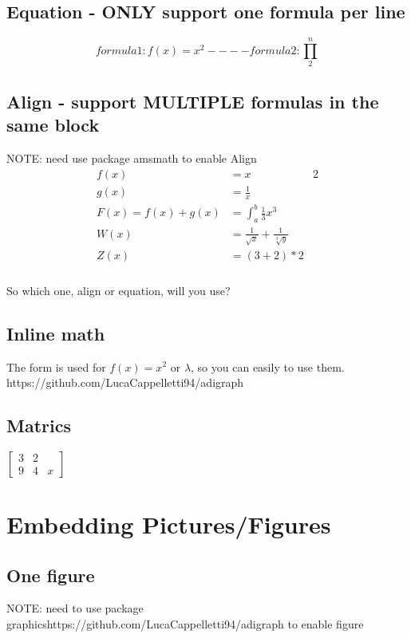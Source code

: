 \documentclass{article}   %
\begin{document}
  \subsection{Equation - ONLY support one formula per line}
  \begin{equation}
    formula 1: f(x) = x^2   ----
    formula 2: \prod_{2}^{n}
  \end{equation}

  \subsection{Align - support MULTIPLE formulas in the same block}
  NOTE: need use package amsmath to enable Align 
  \begin{align*}
    f(x) &= x & 2 \\
    g(x) &= \frac{1}{x} \\
    F(x) = f(x) + g(x) &= \int_{a}^{b} \frac{1}{3}x^3 \\
    W(x) &= \frac{1}{\sqrt{x}} + \frac{1}{\sqrt[3]{y}} \\
    Z(x) &= \left( 3 + 2 \right) * 2
  \end{align*}
  \subsubsection{}
  So which one, align or equation, will you use?


  \subsection{Inline math}
  The form is used for $ f(x) = x^ 2 $ or $\lambda$, so you can easily to use them. 
  https://github.com/LucaCappelletti94/adigraph
  \subsection{Matrics}
  $
  \left[
  \begin{matrix}
    3 & 2 \\
    9 & 4 & x
  \end{matrix}
  \right]
  $

  \newpage


  \section{Embedding Pictures/Figures}

  \subsection{One figure}
  NOTE: need to use package graphicshttps://github.com/LucaCappelletti94/adigraph to enable figure
\end{document}
